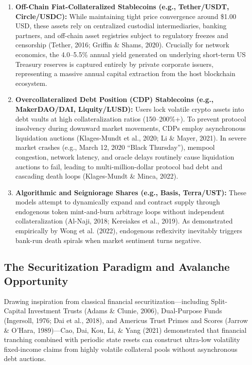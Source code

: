 \documentclass[11pt,a4paper]{article}
\begin{document}
\begin{enumerate}[label=(\roman*)]
    \item \textbf{Off-Chain Fiat-Collateralized Stablecoins (e.g., Tether/USDT, Circle/USDC):} While maintaining tight price convergence around \$1.00 USD, these assets rely on centralized custodial intermediaries, banking partners, and off-chain asset registries subject to regulatory freezes and censorship (Tether, 2016; Griffin \& Shams, 2020). Crucially for network economics, the 4.0--5.5\% annual yield generated on underlying short-term US Treasury reserves is captured entirely by private corporate issuers, representing a massive annual capital extraction from the host blockchain ecosystem.
    \item \textbf{Overcollateralized Debt Position (CDP) Stablecoins (e.g., MakerDAO/DAI, Liquity/LUSD):} Users lock volatile crypto assets into debt vaults at high collateralization ratios (150--200\%+). To prevent protocol insolvency during downward market movements, CDPs employ asynchronous liquidation auctions (Klages-Mundt et al., 2020; Li \& Mayer, 2021). In severe market crashes (e.g., March 12, 2020 ``Black Thursday''), mempool congestion, network latency, and oracle delays routinely cause liquidation auctions to fail, leading to multi-million-dollar protocol bad debt and cascading death loops (Klages-Mundt \& Minca, 2022).
    \item \textbf{Algorithmic and Seigniorage Shares (e.g., Basis, Terra/UST):} These models attempt to dynamically expand and contract supply through endogenous token mint-and-burn arbitrage loops without independent collateralization (Al-Naji, 2018; Kereiakes et al., 2019). As demonstrated empirically by Wong et al. (2022), endogenous reflexivity inevitably triggers bank-run death spirals when market sentiment turns negative.
\end{enumerate}

\subsection{The Securitization Paradigm and Avalanche Opportunity}
Drawing inspiration from classical financial securitization---including Split-Capital Investment Trusts (Adams \& Clunie, 2006), Dual-Purpose Funds (Ingersoll, 1976; Dai et al., 2018), and Americus Trust Primes and Scores (Jarrow \& O'Hara, 1989)---Cao, Dai, Kou, Li, \& Yang (2021) demonstrated that financial tranching combined with periodic state resets can construct ultra-low volatility fixed-income claims from highly volatile collateral pools without asynchronous debt auctions.
\end{document}
